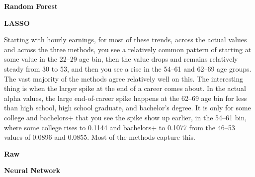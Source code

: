 \documentclass[12pt]{article}
\begin{document}
\begin{onehalfspace}
\begin{table}[H]
    \vspace{10pt}

    \begin{minipage}[t]{0.48\textwidth}
        \centering
        \textbf{Random Forest}\\[4pt]
        \resizebox{\linewidth}{!}{%
            
        }
    \end{minipage}\hfill
    \begin{minipage}[t]{0.48\textwidth}
        \centering
        \textbf{LASSO}\\[4pt]
        \resizebox{\linewidth}{!}{%
            
        }
    \end{minipage}
\end{table}

Starting with hourly earnings, for most of these trends, across the actual values and across the three methods, you see a relatively common pattern of starting at some value in the 22--29 age bin, then the value drops and remains relatively steady from 30 to 53, and then you see a rise in the 54--61 and 62--69 age groups. The vast majority of the methods agree relatively well on this. The interesting thing is when the larger spike at the end of a career comes about. In the actual alpha values, the large end-of-career spike happens at the 62--69 age bin for less than high school, high school graduate, and bachelor's degree. It is only for some college and bachelors+ that you see the spike show up earlier, in the 54--61 bin, where some college rises to 0.1144 and bachelors+ to 0.1077 from the 46--53 values of 0.0896 and 0.0855. Most of the methods capture this.

\begin{table}[H]
    \centering
    \caption{Mean Predicted Alpha by Education and Age Bin, Annual Earnings (x 100)}
    \label{tab:alpha_fearn_pred_matrix}
    \begin{minipage}[t]{0.48\textwidth}
        \centering
        \textbf{Raw}\\[4pt]
        \resizebox{\linewidth}{!}{%
            
        }
    \end{minipage}\hfill
    \begin{minipage}[t]{0.48\textwidth}
        \centering
        \textbf{Neural Network}\\[4pt]
        \resizebox{\linewidth}{!}{%
            
        }
    \end{minipage}


\end{table}
\end{onehalfspace}
\end{document}
